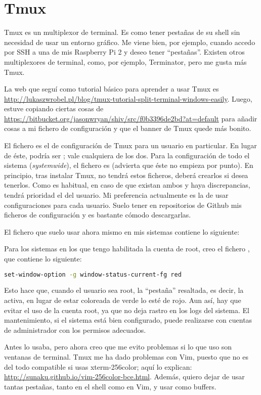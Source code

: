 \section{Tmux}\label{sec:tmux}
Tmux es un multiplexor de terminal. Es como tener pestañas de su shell sin necesidad de usar un entorno gráfico.
Me viene bien, por ejemplo, cuando accedo por SSH a una de mis Raspberry Pi 2 y deseo tener ``pestañas''.
Existen otros multiplexores de terminal, como, por ejemplo, Terminator, pero me gusta más Tmux.

La web que seguí como tutorial básico para aprender a usar Tmux es
\url{http://lukaszwrobel.pl/blog/tmux-tutorial-split-terminal-windows-easily}. Luego, estuve copiando ciertas
cosas de \url{https://bitbucket.org/jasonwryan/shiv/src/f0b3396de2bd?at=default} para añadir cosas a mi fichero
de configuración y que el banner de Tmux quede más bonito.

El fichero  es el de configuración de Tmux para un usuario en particular. En lugar de éste,
podría ser ; vale cualquiera de los dos. Para la configuración de todo el sistema
(\foreignlanguage{english}{\textit{systemwide}}), el fichero es  (advierta que éste no
empieza por punto). En principio, tras instalar Tmux, no tendrá estos ficheros, deberá crearlos si desea
tenerlos. Como es habitual, en caso de que existan ambos y haya discrepancias, tendrá prioridad el del usuario.
Mi preferencia actualmente es la de usar configuraciones para cada usuario. Suelo tener en repositorios de
Github mis ficheros de configuración y es bastante cómodo descargarlas.

El fichero  que suelo usar ahora mismo en mis sistemas contiene lo siguiente:


\noindent Para los sistemas en los que tengo habilitada la cuenta de root, creo el fichero
, que contiene lo siguiente:

\begin{lstlisting}[gobble=2,language=bash,style=bashinteract,escapechar=!]
  set-window-option -g window-status-current-fg red
\end{lstlisting}

\noindent Esto hace que, cuando el usuario sea root, la ``pestaña'' resaltada, es decir, la activa, en lugar de
estar coloreada de verde lo esté de rojo. Aun así, hay que evitar el uso de la cuenta root, ya que no deja
rastro en los logs del sistema. El mantenimiento, si el sistema está bien configurado, puede realizarse con
cuentas de administrador con los permisos adecuados.

Antes lo usaba, pero ahora creo que me evito problemas si lo que uso son ventanas de terminal. Tmux me ha dado
problemas con Vim, puesto que no es del todo compatible si usas xterm-256color; aquí lo explican:
\url{http://sunaku.github.io/vim-256color-bce.html}. Además, quiero dejar de usar tantas pestañas, tanto en el
shell como en Vim, y usar como buffers.
